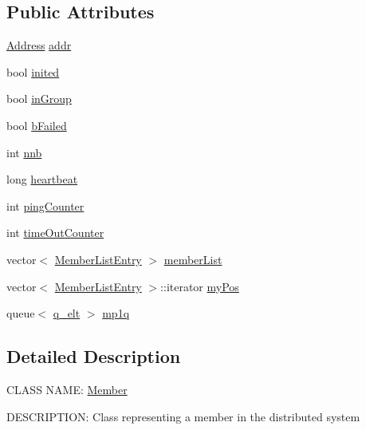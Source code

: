\subsection*{\-Public \-Attributes}
\begin{DoxyCompactItemize}
\item 
\hyperlink{class_address}{\-Address} \hyperlink{class_member_a15255ad694aab6b42313f01d9f1c2b03}{addr}
\item 
bool \hyperlink{class_member_a1c7380a6632aecda712316ca24f3f015}{inited}
\item 
bool \hyperlink{class_member_aaa10136152397774c018ad7775369e55}{in\-Group}
\item 
bool \hyperlink{class_member_adf9e67156c652455a281dfaeed31e4b3}{b\-Failed}
\item 
int \hyperlink{class_member_a74c51884e3d80e38ef3c25e8c111cd9b}{nnb}
\item 
long \hyperlink{class_member_a112370796bf495cafda11827a21682a4}{heartbeat}
\item 
int \hyperlink{class_member_abc5127f9400138b743b8bc437758611a}{ping\-Counter}
\item 
int \hyperlink{class_member_a30c6e44397b58f19f28383e2d454f6ad}{time\-Out\-Counter}
\item 
vector$<$ \hyperlink{class_member_list_entry}{\-Member\-List\-Entry} $>$ \hyperlink{class_member_a7c3872c420af12628ce50bbc66010842}{member\-List}
\item 
vector$<$ \hyperlink{class_member_list_entry}{\-Member\-List\-Entry} $>$\-::iterator \hyperlink{class_member_a50bf6051866f7968484600b98d784303}{my\-Pos}
\item 
queue$<$ \hyperlink{classq__elt}{q\-\_\-elt} $>$ \hyperlink{class_member_a62f45dfeaee8e141c328149f6c36efe2}{mp1q}
\end{DoxyCompactItemize}


\subsection{\-Detailed \-Description}
\-C\-L\-A\-S\-S \-N\-A\-M\-E\-: \hyperlink{class_member}{\-Member}

\-D\-E\-S\-C\-R\-I\-P\-T\-I\-O\-N\-: \-Class representing a member in the distributed system 

